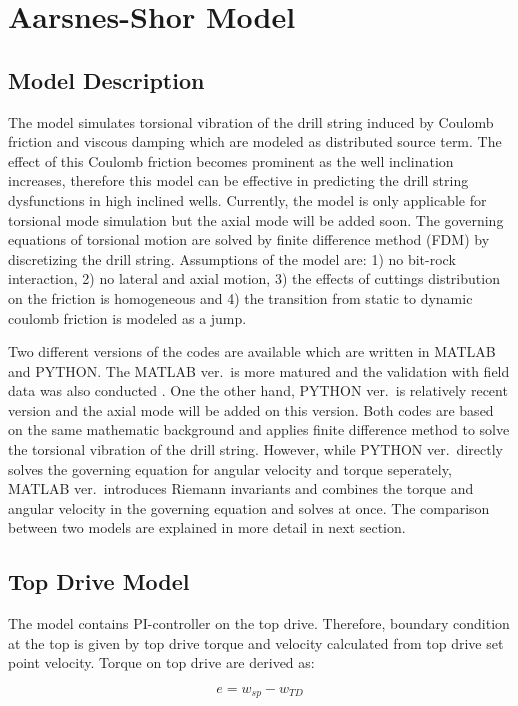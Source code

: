 \chapter{Aarsnes-Shor Model}
\label{ch:aarnessshormodel}

\section{Model Description}
The model simulates torsional vibration of the drill string induced by Coulomb friction and viscous damping which are modeled as distributed source term. The effect of this Coulomb friction becomes prominent as the well inclination increases, therefore this model can be effective in predicting the drill string dysfunctions in high inclined wells. Currently, the model is only applicable for torsional mode simulation but the axial mode will be added soon. The governing equations of torsional motion are solved by finite difference method (FDM) by discretizing the drill string. Assumptions of the model are: 1) no bit-rock interaction, 2) no lateral and axial motion, 3) the effects of cuttings distribution on the friction is homogeneous and 4) the transition from static to dynamic coulomb friction is modeled as a jump. 

Two different versions of the codes are available which are written in MATLAB and PYTHON. The MATLAB ver.\ is more matured and the validation with field data was also conducted \cite{ref:aarsnes2017a}. One the other hand, PYTHON ver.\ is relatively recent version and the axial mode will be added on this version. Both codes are based on the same mathematic background and applies finite difference method to solve the torsional vibration of the drill string. However, while PYTHON ver.\ directly solves the governing equation for angular velocity and torque seperately, MATLAB ver.\ introduces Riemann invariants and combines the torque and angular velocity in the governing equation and solves at once. The comparison between two models are explained in more detail in next section. 

\section{Top Drive Model}
The model contains PI-controller on the top drive. Therefore, boundary condition at the top is given by top drive torque and velocity calculated from top drive set point velocity. Torque on top drive are derived as:

\begin{equation}\label{AS_err}
  e = w_{sp} - w_{TD}
\end{equation}

